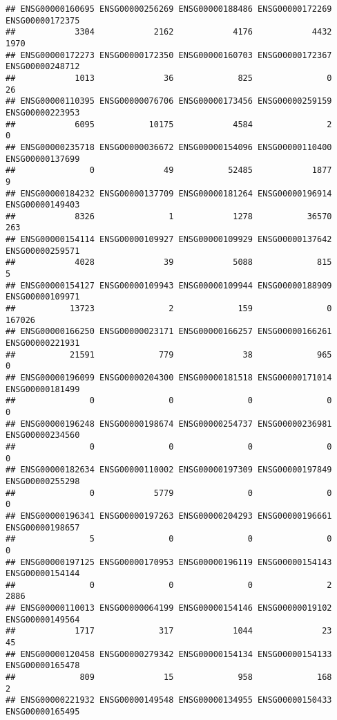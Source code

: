 \documentclass[
]{article}
\begin{document}
\begin{verbatim}
## ENSG00000160695 ENSG00000256269 ENSG00000188486 ENSG00000172269 ENSG00000172375 
##            3304            2162            4176            4432            1970 
## ENSG00000172273 ENSG00000172350 ENSG00000160703 ENSG00000172367 ENSG00000248712 
##            1013              36             825               0              26 
## ENSG00000110395 ENSG00000076706 ENSG00000173456 ENSG00000259159 ENSG00000223953 
##            6095           10175            4584               2               0 
## ENSG00000235718 ENSG00000036672 ENSG00000154096 ENSG00000110400 ENSG00000137699 
##               0              49           52485            1877               9 
## ENSG00000184232 ENSG00000137709 ENSG00000181264 ENSG00000196914 ENSG00000149403 
##            8326               1            1278           36570             263 
## ENSG00000154114 ENSG00000109927 ENSG00000109929 ENSG00000137642 ENSG00000259571 
##            4028              39            5088             815               5 
## ENSG00000154127 ENSG00000109943 ENSG00000109944 ENSG00000188909 ENSG00000109971 
##           13723               2             159               0          167026 
## ENSG00000166250 ENSG00000023171 ENSG00000166257 ENSG00000166261 ENSG00000221931 
##           21591             779              38             965               0 
## ENSG00000196099 ENSG00000204300 ENSG00000181518 ENSG00000171014 ENSG00000181499 
##               0               0               0               0               0 
## ENSG00000196248 ENSG00000198674 ENSG00000254737 ENSG00000236981 ENSG00000234560 
##               0               0               0               0               0 
## ENSG00000182634 ENSG00000110002 ENSG00000197309 ENSG00000197849 ENSG00000255298 
##               0            5779               0               0               0 
## ENSG00000196341 ENSG00000197263 ENSG00000204293 ENSG00000196661 ENSG00000198657 
##               5               0               0               0               0 
## ENSG00000197125 ENSG00000170953 ENSG00000196119 ENSG00000154143 ENSG00000154144 
##               0               0               0               2            2886 
## ENSG00000110013 ENSG00000064199 ENSG00000154146 ENSG00000019102 ENSG00000149564 
##            1717             317            1044              23              45 
## ENSG00000120458 ENSG00000279342 ENSG00000154134 ENSG00000154133 ENSG00000165478 
##             809              15             958             168               2 
## ENSG00000221932 ENSG00000149548 ENSG00000134955 ENSG00000150433 ENSG00000165495 

\end{verbatim}
\end{document}
